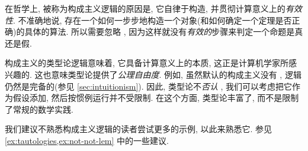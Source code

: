 在哲学上, 被称为构成主义逻辑的原因是, 它自律于构造, 并贯彻计算意义上的\emph{有效性}. 不准确地说, 存在一个如何一步步地构造一个对象(和如何确定一个定理是否正确)的具体的算法. 所以需要忽略 \LEM{}, 因为这样就没有\emph{有效的}步骤来判定一个命题是真还是假. 

构成主义的类型论逻辑意味着, 它具备计算意义上的本质, 这正是计算机学家所感兴趣的. 这也意味类型论提供了\emph{公理自由度}. 例如, 虽然默认的构成主义没有 \LEM{}, 逻辑仍然是完备的(参见 \cref{sec:intuitionism}). 因此, 类型论不\emph{否认} \LEM{}, 我们可以考虑把它作为假设添加, 然后按惯例运行并不受限制. 在这个方面, 类型论丰富了, 而不是限制了常规的数学实践. 

我们建议不熟悉构成主义逻辑的读者尝试更多的示例, 以此来熟悉它. 参见 \cref{ex:tautologies,ex:not-not-lem} 中的一些建议. 

\mentalpause

